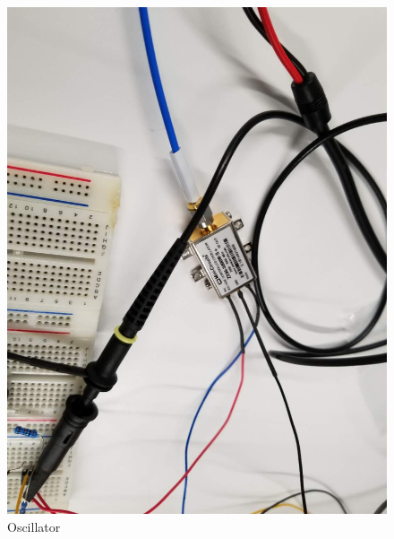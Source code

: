 \documentclass[12pt,a4paper]{report}
\begin{document}
\begin{figure}[ht]
    \centerline{\includegraphics[scale=0.2]{Oscillator.PNG}}
    \caption{Oscillator}
    \label{fig:Oscilaltor}
\end{figure}
\end{document}
